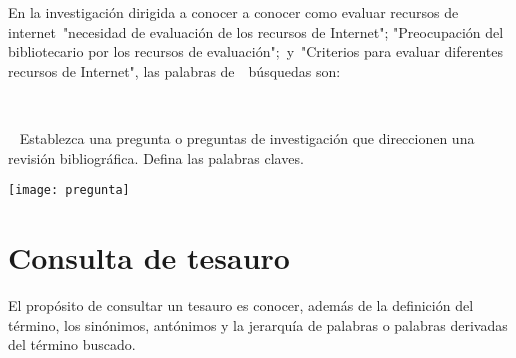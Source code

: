  
  En la  investigación dirigida a conocer a conocer como evaluar recursos de internet "necesidad de evaluación de los recursos de Internet"; "Preocupación del bibliotecario por los recursos de evaluación"; y "Criterios para evaluar diferentes recursos de Internet", las palabras de  búsquedas son:
   
   
    \begin{kaobox}[frametitle=Ejercicio]
    	Establezca una pregunta o preguntas de investigación que direccionen una revisión bibliográfica. Defina las palabras claves.
    \end{kaobox}

\begin{marginfigure}[-1.2cm]%
	\texttt{[image: pregunta]}
\end{marginfigure}

\section{Consulta de tesauro}

El propósito de consultar un tesauro es conocer, además de la definición del término, los sinónimos, antónimos y la jerarquía de palabras o palabras derivadas del término buscado.

 
 

